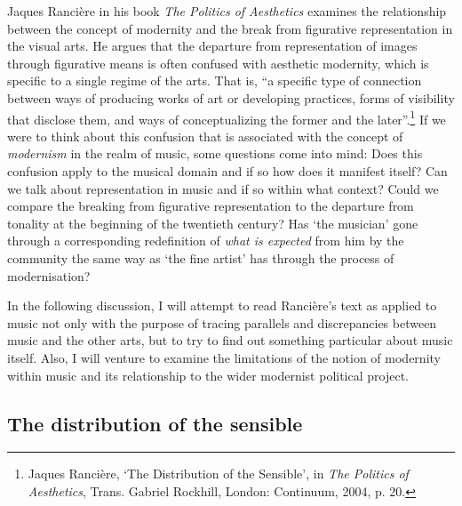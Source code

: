 Jaques Ranci\`{e}re in his book \emph{The Politics of Aesthetics} examines the relationship between the concept of modernity and the break from figurative representation in the visual arts. He argues that the departure from representation of images through figurative means is often confused with aesthetic modernity, which is specific to a single regime of the arts. That is, ``a specific type of connection between ways of producing works of art or developing practices, forms of visibility that disclose them, and ways of conceptualizing the former and the later''.\footnote{Jaques Ranci\`{e}re, `The Distribution of the Sensible', in \emph{The Politics of Aesthetics}, Trans. Gabriel Rockhill, London: Continuum, 2004, p. 20.} If we were to think about this confusion that is associated with the concept of \emph{modernism} in the realm of music, some questions come into mind: Does this confusion apply to the musical domain and if so how does it manifest itself? Can we talk about representation in music and if so within what context? Could we compare the breaking from figurative representation to the departure from tonality at the beginning of the twentieth century? Has `the musician' gone through a corresponding redefinition of \emph{what is expected} from him by the community the same way as `the fine artist' has through the process of modernisation?

In the following discussion, I will attempt to read Ranci\`{e}re's text as applied to music not only with the purpose of tracing parallels and discrepancies between music and the other arts, but to try to find out something particular about music itself. Also, I will venture to examine the limitations of the notion of modernity within music and its relationship to the wider modernist political project.

\subsection{The distribution of the sensible}

